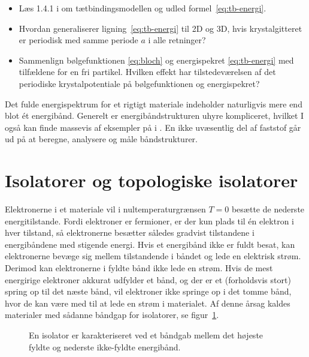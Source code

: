 \documentclass[11pt, a4paper]{article}
\begin{document}
\begin{itemize}
\item Læs 1.4.1 i \cite{gp} om tætbindingsmodellen og udled
  formel~\eqref{eq:tb-energi}.
\item Hvordan generaliserer ligning~\eqref{eq:tb-energi} til 2D og 3D,
  hvis krystalgitteret er periodisk med samme periode $a$ i alle
  retninger?
\item Sammenlign bølgefunktionen \eqref{eq:bloch} og energispekret
  \eqref{eq:tb-energi} med tilfældene for en fri partikel. Hvilken
  effekt har tilstedeværelsen af det periodiske krystalpotentiale på
  bølgefunktionen og energispekret?
\end{itemize}

Det fulde energispektrum for et rigtigt materiale indeholder
naturligvis mere end blot ét energibånd. Generelt er
energibåndstrukturen uhyre kompliceret, hvilket I også kan finde
massevis af eksempler på i \cite{gp}. En ikke uvæsentlig del af
faststof går ud på at beregne, analysere og måle båndstrukturer.

\section{Isolatorer og topologiske isolatorer}

Elektronerne i et materiale vil i nultemperaturgrænsen $T=0$ besætte
de nederste energitilstande. Fordi elektroner er fermioner, er der kun
plads til én elektron i hver tilstand, så elektronerne besætter
således gradvist tilstandene i energibåndene med stigende energi. Hvis
et energibånd ikke er fuldt besat, kan elektronerne bevæge sig mellem
tilstandende i båndet og lede en elektrisk strøm. Derimod kan
elektronerne i fyldte bånd ikke lede en strøm. Hvis de mest energirige
elektroner akkurat udfylder et bånd, og der er et (forholdsvis stort)
spring op til det næste bånd, vil elektroner ikke springe op i det
tomme bånd, hvor de kan være med til at lede en strøm i materialet. Af
denne årsag kaldes materialer med sådanne båndgap for isolatorer, se
figur~\ref{fig:isolator}.

\begin{figure}[htbp]
  \centering
  \caption{En isolator er karakteriseret ved et båndgab mellem det
    højeste fyldte og nederste ikke-fyldte energibånd.}
  \label{fig:isolator}
\end{figure}
\end{document}
